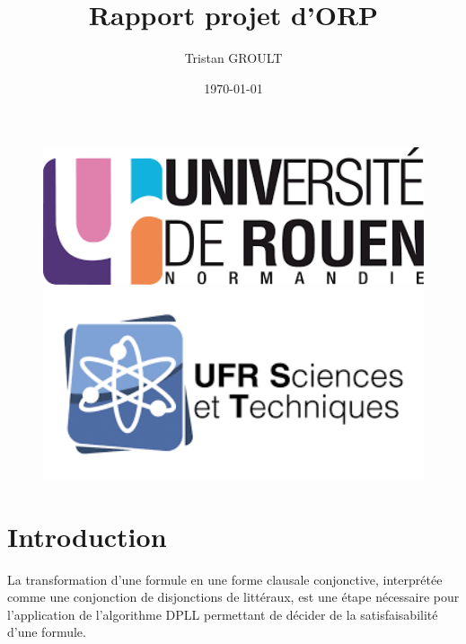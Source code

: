 \documentclass[a4paper, 12pt]{article}
\title{Rapport projet d'ORP} \author{Tristan GROULT} \date{\today}
\begin{document}
\begin{figure}[t] \centering \begin{minipage}{0.3\textwidth} \centering \includegraphics[width=1\textwidth]{logo_univ.png} \end{minipage} \hfill \begin{minipage}{0.3\textwidth} \centering \includegraphics[width=1\textwidth]{ufr_logo.png} \end{minipage} \end{figure}

\maketitle

\clearpage\setcounter{page}{2}

{ 
\hypersetup{hidelinks} %
\renewcommand{\contentsname}{Sommaire} 
\tableofcontents %
}

\clearpage

\section{Introduction}

La transformation d'une formule en une forme clausale conjonctive, interprétée comme une conjonction de disjonctions de littéraux, est une étape nécessaire pour l'application de l'algorithme DPLL permettant de décider de la satisfaisabilité d'une formule.
\end{document}
